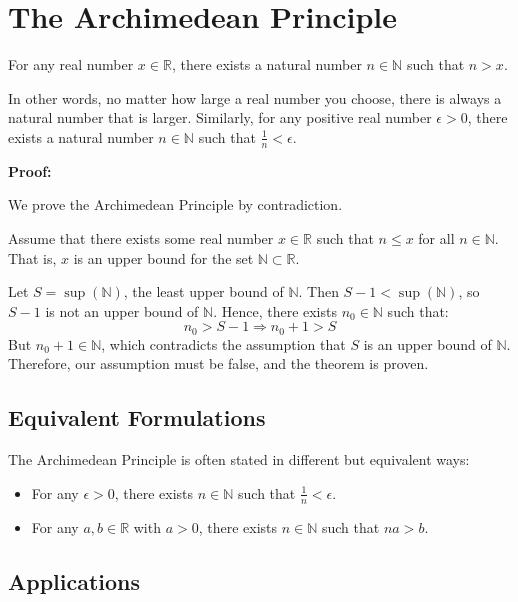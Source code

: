 \section{The Archimedean Principle}

For any real number \( x \in \mathbb{R} \), there exists a natural number \( n \in \mathbb{N} \) such that \( n > x \).

In other words, no matter how large a real number you choose, there is always a natural number that is larger. Similarly, for any positive real number \( \epsilon > 0 \), there exists a natural number \( n \in \mathbb{N} \) such that \( \frac{1}{n} < \epsilon \).

\textbf{Proof:}

We prove the Archimedean Principle by contradiction.

Assume that there exists some real number \( x \in \mathbb{R} \) such that \( n \leq x \) for all \( n \in \mathbb{N} \). That is, \( x \) is an upper bound for the set \( \mathbb{N} \subset \mathbb{R} \).

Let \( S = \sup(\mathbb{N}) \), the least upper bound of \( \mathbb{N} \). Then \( S - 1 < \sup(\mathbb{N}) \), so \( S - 1 \) is not an upper bound of \( \mathbb{N} \). Hence, there exists \( n_0 \in \mathbb{N} \) such that:
\[
	n_0 > S - 1 \Rightarrow n_0 + 1 > S
\]
But \( n_0 + 1 \in \mathbb{N} \), which contradicts the assumption that \( S \) is an upper bound of \( \mathbb{N} \). Therefore, our assumption must be false, and the theorem is proven.

\QED

\subsection{Equivalent Formulations}

The Archimedean Principle is often stated in different but equivalent ways:

\begin{itemize}[label=\(-\)]
	\item For any \( \epsilon > 0 \), there exists \( n \in \mathbb{N} \) such that \( \frac{1}{n} < \epsilon \).
	\item For any \( a, b \in \mathbb{R} \) with \( a > 0 \), there exists \( n \in \mathbb{N} \) such that \( na > b \).
\end{itemize}

\subsection{Applications}

